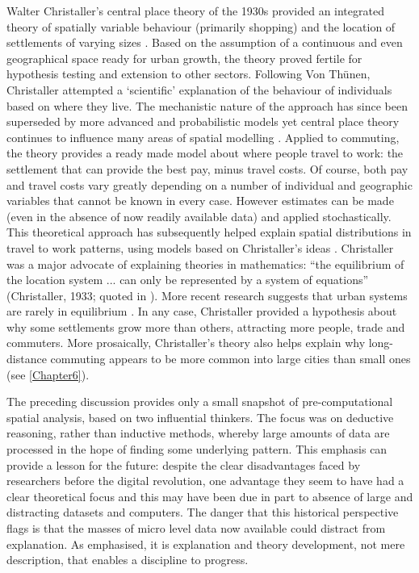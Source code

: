 Walter Christaller's central place theory of the 1930s provided an integrated
theory of spatially variable behaviour (primarily shopping) and the location of
settlements of varying sizes \citep{matthews2008geography}. Based on the
assumption of a continuous and even geographical space ready for urban growth,
the theory proved fertile for hypothesis testing and extension to other sectors.
Following Von Th\"{u}nen, Christaller
attempted a `scientific' explanation of the behaviour of individuals based on
where they live. The mechanistic nature of the approach has since been
superseded by more advanced and probabilistic models
yet central place theory continues to influence
many areas of spatial modelling \citep{Wilson1972-theoretical, Sonis2005,
Farooq2012-integreted}. Applied to commuting, the theory provides a ready made
model about where people travel to work: the settlement that can provide the
best pay, minus travel costs. Of course, both pay and travel costs vary greatly
depending on a number of individual and geographic variables that cannot be known
in every case. However estimates can be made (even in the absence of now
readily available data) and applied stochastically. 
This theoretical approach has subsequently helped
explain spatial distributions in travel to work patterns, using models based on
Christaller's ideas \citep{Tabuchi2006-commuting-costs}. Christaller was
a major advocate of explaining theories in
mathematics: ``the equilibrium of the location system ... can only be
represented by a system of equations'' (Christaller, 1933; quoted in
\citealp[p.~35]{Wilson1972-theoretical}).
More recent research suggests that urban systems are rarely in equilibrium
\citep{batty2007cities}. In any case, Christaller provided a hypothesis about
why some settlements grow more than others, attracting more people, trade and
commuters.
More prosaically, Christaller's theory also helps explain why
long-distance commuting appears to be more common into large cities than small ones
(see \cref{Chapter6}).

The preceding discussion provides only a small snapshot of pre-computational
spatial analysis, based on two influential thinkers. The
focus was on deductive reasoning, rather than inductive methods, whereby large
amounts of data are processed in the hope of finding some underlying pattern.
This emphasis can provide a lesson for the future: despite the clear
disadvantages faced by researchers before the digital revolution, one
advantage they seem to have had a clear theoretical focus and this may
have been due in part to absence of large and distracting datasets and
computers.
The danger that this historical perspective flags is that the masses of
micro level data now available could distract from explanation. As
\citet{Wilson1972-theoretical} emphasised, it is explanation and theory
development, not mere description, that enables a discipline to progress. 

